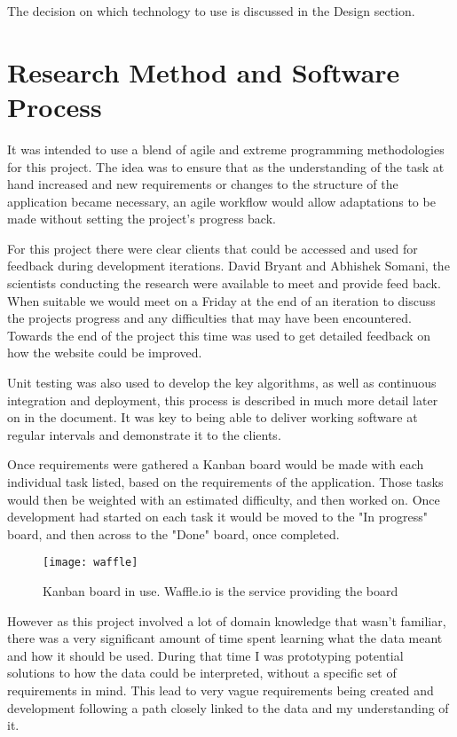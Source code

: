 The decision on which technology to use is discussed in the Design section. 

\section{Research Method and Software Process}
It was intended to use a blend of agile and extreme programming methodologies for this project. The idea was to ensure that as the understanding of the task at hand increased and new requirements or changes to the structure of the application became necessary, an agile workflow would allow adaptations to be made without setting the project's progress back. 

For this project there were clear clients that could be accessed and used for feedback during development iterations. David Bryant and Abhishek Somani, the scientists conducting the research were available to meet and provide feed back. When suitable we would meet on a Friday at the end of an iteration to discuss the projects progress and any difficulties that may have been encountered. Towards the end of the project this time was used to get detailed feedback on how the website could be improved. 

Unit testing was also used to develop the key algorithms, as well as continuous integration and deployment, this process is described in much more detail later on in the document. It was key to being able to deliver working software at regular intervals and demonstrate it to the clients. 

Once requirements were gathered a Kanban board would be made with each individual task listed, based on the requirements of the application. Those tasks would then be weighted with an estimated difficulty, and then worked on. Once development had started on each task it would be moved to the "In progress" board, and then across to the "Done" board, once completed. 

\begin{figure}[ht!]
\begin{center}
\texttt{[image: waffle]}
\caption{Kanban board in use. Waffle.io is the service providing the board}
\end{center}
\end{figure}

However as this project involved a lot of domain knowledge that wasn't familiar, there was a very significant amount of time spent learning what the data meant and how it should be used. During that time I was prototyping potential solutions to how the data could be interpreted, without a specific set of requirements in mind. This lead to very vague requirements being created and development following a path closely linked to the data and my understanding of it. 

